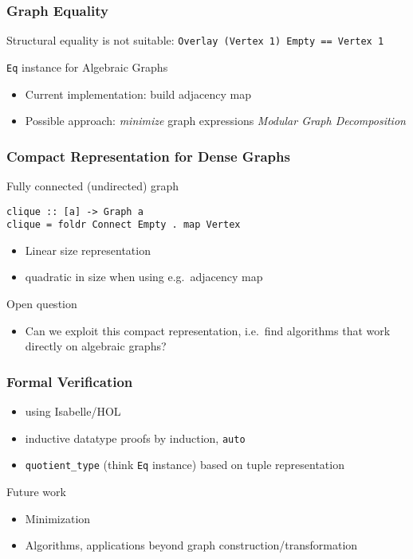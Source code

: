 \documentclass{beamer}
\newcommand{\hs}{\texttt}
\begin{document}
\begin{frame}
  \frametitle{Graph Equality}
  \onslide<+->
  Structural equality is not suitable: \hs{Overlay (Vertex 1) Empty == Vertex 1}
  \onslide<+->
  \begin{alertblock}{\hs{Eq} instance for Algebraic Graphs}
    \begin{itemize}
    \item Current implementation: build adjacency map
    \item<+-> Possible approach: \emph{minimize} graph expressions
      \textrightarrow \emph{Modular Graph Decomposition}
    \end{itemize}
  \end{alertblock}
\end{frame}

\begin{frame}[fragile]
  \frametitle{Compact Representation for Dense Graphs}
  \onslide<+->
  Fully connected (undirected) graph
  \begin{verbatim}
clique :: [a] -> Graph a
clique = foldr Connect Empty . map Vertex
  \end{verbatim}
  \onslide<+->
  \begin{itemize}
  \item \alert{Linear size representation}
  \item quadratic in size when using e.g.\ adjacency map
  \end{itemize}
  \onslide<+->
  \begin{exampleblock}{Open question}
    \begin{itemize}
    \item Can we exploit this compact representation, i.e.\ find algorithms that
      work directly on algebraic graphs?
    \end{itemize}
  \end{exampleblock}
\end{frame}

\begin{frame}
  \frametitle{Formal Verification}
  \begin{itemize}[<+->]
  \item using Isabelle/HOL
  \item inductive datatype \textrightarrow{} proofs by induction, \texttt{auto}
  \item \texttt{quotient\_type} (think \hs{Eq} instance) based on tuple representation
  \end{itemize}
  \onslide<+->
  \begin{exampleblock}{Future work}
    \begin{itemize}
    \item Minimization
    \item Algorithms, applications beyond graph construction/transformation
    \end{itemize}
  \end{exampleblock}
\end{frame}
\end{document}
